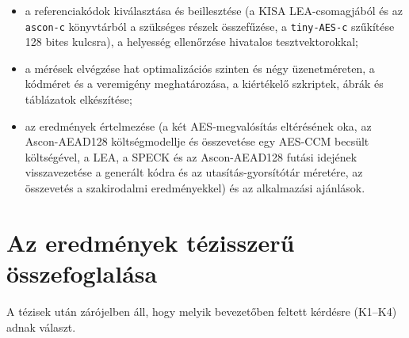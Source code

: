 \documentclass[a4paper,12pt]{report}
\theoremstyle{definition}
\theoremstyle{remark}
\begin{document}
\begin{itemize}
	\item a referenciakódok kiválasztása és beillesztése (a KISA LEA-csomagjából és az \texttt{ascon-c} könyvtárból a szükséges részek összefűzése, a \texttt{tiny-AES-c} szűkítése 128 bites kulcsra), a helyesség ellenőrzése hivatalos tesztvektorokkal;
	\item a mérések elvégzése hat optimalizációs szinten és négy üzenetméreten, a kódméret és a veremigény meghatározása, a kiértékelő szkriptek, ábrák és táblázatok elkészítése;
	\item az eredmények értelmezése (a két AES-megvalósítás eltérésének oka, az Ascon-AEAD128 költségmodellje és összevetése egy AES-CCM becsült költségével, a LEA, a SPECK és az Ascon-AEAD128 futási idejének visszavezetése a generált kódra és az utasítás-gyorsítótár méretére, az összevetés a szakirodalmi eredményekkel) és az alkalmazási ajánlások.
\end{itemize}

\section{Az eredmények tézisszerű összefoglalása}\label{sec:tezisek}

A tézisek után zárójelben áll, hogy melyik bevezetőben feltett kérdésre (K1--K4) adnak választ.
\end{document}
